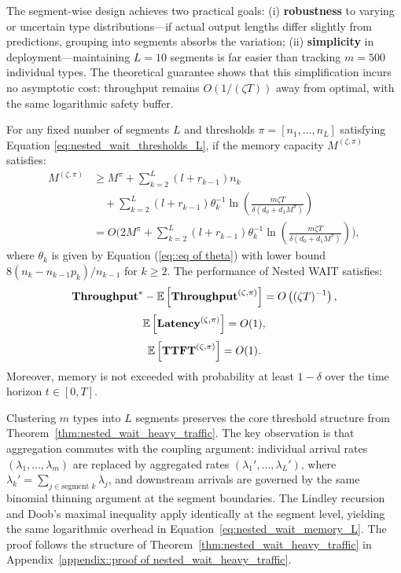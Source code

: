 The segment-wise design achieves two practical goals: (i) \textbf{robustness} to varying or uncertain type distributions—if actual output lengths differ slightly from predictions, grouping into segments absorbs the variation; (ii) \textbf{simplicity} in deployment—maintaining $L=10$ segments is far easier than tracking $m=500$ individual types. The theoretical guarantee shows that this simplification incurs no asymptotic cost: throughput remains $O(1/(\zeta T))$ away from optimal, with the same logarithmic safety buffer.

\begin{theorem}
\label{thm:nested_wait_heavy_traffic, any segment}
For any fixed number of segments $L$ and thresholds $\pi = [n_1, \dots, n_L]$ satisfying Equation \eqref{eq:nested_wait_thresholds_L}, if the memory capacity $M^{(\zeta, \pi)}$ satisfies:
\begin{equation}
    \label{eq:nested_wait_memory_L}
    \begin{aligned}
M^{(\zeta, \pi)}
&\geq M^\pi
+ \sum_{k=2}^L (l + r_{k-1}) n_k \\
&\quad
+ \sum_{k=2}^L (l + r_{k-1}) \theta_k^{-1}
\ln\left( \frac{m \zeta T}{\delta(d_0+d_1M^\pi)} \right) \\
&= O\biggl( 2M^\pi
+ \sum_{k=2}^L (l + r_{k-1}) \theta_k^{-1}
\ln\left( \frac{m \zeta T}{\delta(d_0+d_1M^\pi)} \right) \biggr),
    \end{aligned}
\end{equation}
where $\theta_k$ is given by Equation (\ref{eq::eq of theta}) with lower bound $8(n_k-n_{k-1}p_k)/n_{k-1}$ for \(k\ge2\).
The performance of Nested WAIT satisfies:
$$\textbf{Throughput}^* - \mathbb{E}\left[ \textbf{Throughput}^{(\zeta, \pi)} \right] = O\left( (\zeta T)^{-1} \right),$$
$$\mathbb{E}\left[ \textbf{Latency}^{(\zeta, \pi)} \right] = O(1),$$
$$\mathbb{E}\left[ \textbf{TTFT}^{(\zeta, \pi)} \right] = O(1).$$
Moreover, memory is not exceeded with probability at least \( 1 - \delta \) over the time horizon \(t \in [0,T]\).
\end{theorem}

Clustering $m$ types into $L$ segments preserves the core threshold structure from Theorem~\ref{thm:nested_wait_heavy_traffic}. The key observation is that aggregation commutes with the coupling argument: individual arrival rates $(\lambda_1, \dots, \lambda_m)$ are replaced by aggregated rates $(\lambda_1', \dots, \lambda_L')$, where $\lambda_k' = \sum_{j \in \text{segment } k} \lambda_j$, and downstream arrivals are governed by the same binomial thinning argument at the segment boundaries. The Lindley recursion and Doob's maximal inequality apply identically at the segment level, yielding the same logarithmic overhead in Equation~\eqref{eq:nested_wait_memory_L}. The proof follows the structure of Theorem~\ref{thm:nested_wait_heavy_traffic} in Appendix~\ref{appendix::proof of nested_wait_heavy_traffic}.

